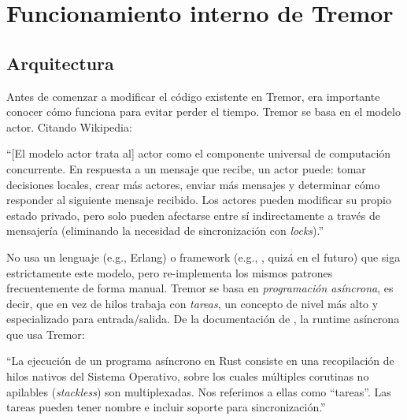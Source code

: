 \chapter{Funcionamiento interno de Tremor}\label{annex:tremor}

\section{Arquitectura}

Antes de comenzar a modificar el código existente en Tremor, era importante
conocer cómo funciona para evitar perder el tiempo. Tremor se basa en el modelo
actor. Citando Wikipedia:


``[El modelo actor trata al] actor como el componente universal de computación
concurrente. En respuesta a un mensaje que recibe, un actor puede: tomar
decisiones locales, crear más actores, enviar más mensajes y determinar cómo
responder al siguiente mensaje recibido. Los actores pueden modificar su propio
estado privado, pero solo pueden afectarse entre sí indirectamente a través de
mensajería (eliminando la necesidad de sincronización con
\emph{locks}).''~\cite{wikiactor}

No usa un lenguaje (e.g., Erlang) o framework (e.g., , quizá
en el futuro) que siga estrictamente este modelo, pero re-implementa los mismos
patrones frecuentemente de forma manual. Tremor se basa en \emph{programación
asíncrona}, es decir, que en vez de hilos trabaja con \emph{tareas}, un concepto
de nivel más alto y especializado para entrada/salida. De la documentación de
, la runtime asíncrona que usa Tremor:


``La ejecución de un programa asíncrono en Rust consiste en una recopilación de
hilos nativos del Sistema Operativo, sobre los cuales múltiples corutinas no
apilables (\emph{stackless}) son multiplexadas. Nos referimos a ellas como
``tareas''. Las tareas pueden tener nombre e incluir soporte para
sincronización.''~\cite{asyncstd_task}


